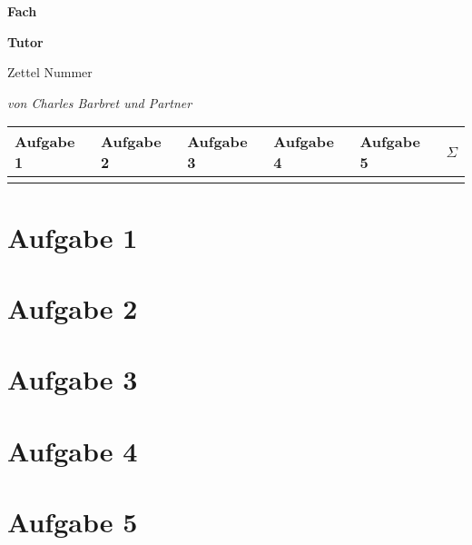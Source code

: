 \documentclass[12pt,a4paper]{article} %
\begin{document}
	\begin{titlepage} %
		\centering
		{\huge\bfseries Fach \par}
		\vspace{1cm}
		{\Large\bfseries Tutor \par}
		\vspace{1cm}
		{\huge Zettel Nummer \par}
		\vspace{2cm}
		{\Large\itshape von Charles Barbret und Partner \par}
		\vspace{5cm}
		\begin{tabular}{|l | l | l | l | l | l |}
			\hline
			Aufgabe 1 & Aufgabe 2 & Aufgabe 3 & Aufgabe 4 & Aufgabe 5 & $\Sigma$ \\ \hline
			{} & {} & {} & {} & {} & {}\\	\hline
		\end{tabular}
	\end{titlepage}
\section*{Aufgabe 1}

\section*{Aufgabe 2}

\section*{Aufgabe 3}

\section*{Aufgabe 4}

\section*{Aufgabe 5}
\end{document}
